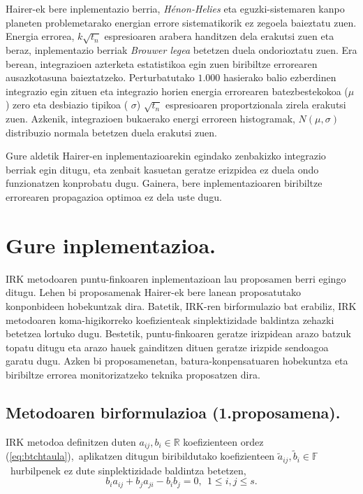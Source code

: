 Hairer-ek bere inplementazio berria, \emph{Hénon-Helies} eta eguzki-sistemaren kanpo planeten problemetarako energian errore sistematikorik ez zegoela baieztatu zuen. Energia errorea, $k\sqrt{t_n}$ espresioaren arabera handitzen dela erakutsi zuen eta beraz, inplementazio berriak \emph{Brouwer legea} \cite{Grazier2005} betetzen duela ondorioztatu zuen. Era berean, integrazioen azterketa estatistikoa egin zuen biribiltze errorearen ausazkotasuna baieztatzeko. Perturbatutako $1.000$ hasierako balio ezberdinen integrazio egin zituen eta integrazio horien energia errorearen batezbestekokoa ($\mu$) zero eta desbiazio tipikoa ( $\sigma$) $\sqrt{t_n}$ espresioaren proportzionala zirela erakutsi zuen. Azkenik, integrazioen bukaerako energi erroreen histogramak, $N(\mu,\sigma)$ distribuzio normala betetzen duela erakutsi zuen.

Gure aldetik Hairer-en inplementazioarekin egindako zenbakizko integrazio berriak egin ditugu, eta zenbait kasuetan geratze erizpidea ez duela ondo funzionatzen konprobatu dugu. Gainera, bere inplementazioaren biribiltze errorearen propagazioa optimoa ez dela uste dugu. 


\section{Gure inplementazioa.}

IRK metodoaren puntu-finkoaren inplementazioan lau proposamen berri egingo ditugu. Lehen bi proposamenak  Hairer-ek bere lanean proposatutako konponbideen hobekuntzak dira. Batetik, IRK-ren birformulazio bat erabiliz, IRK metodoaren koma-higikorreko koefizienteak sinplektizidade baldintza zehazki betetzea lortuko dugu. Bestetik, puntu-finkoaren geratze irizpidean arazo batzuk topatu ditugu eta arazo hauek gainditzen dituen geratze irizpide sendoagoa garatu dugu. Azken bi proposamenetan, batura-konpensatuaren hobekuntza  eta biribiltze errorea monitorizatzeko teknika proposatzen dira.
  

\subsection{Metodoaren birformulazioa (1.proposamena).}

IRK metodoa definitzen duten $a_{ij},b_i  \in \mathbb{R}$ koefizienteen ordez (\ref{eq:btchtaula}),~aplikatzen ditugun biribildutako koefizienteen $\tilde a_{ij},\tilde b_i \in \mathbb{F}$ ~hurbilpenek ez dute sinplektizidade baldintza \cite{JMSanz-Serna1994} betetzen,
\begin{equation}
\label{eq:simplektik2}
b_{i}a_{ij}+b_{j}a_{ji}-b_{i}b_{j}=0, \ \ 1 \leqslant i,j \leqslant s.
\end{equation}  
  
